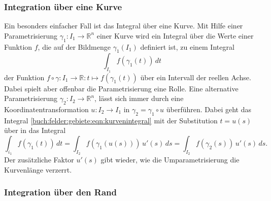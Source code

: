 \subsubsection{Integration über eine Kurve}
Ein besonders einfacher Fall ist das Integral über eine Kurve.
Mit Hilfe einer Parametrisierung $\gamma_1\colon I_1\to\mathbb{R}^n$
einer Kurve wird ein Integral über die Werte einer Funktion $f$, die auf
der Bildmenge $\gamma_1(I_1)$ definiert ist, zu einem Integral
\begin{equation}
\int_{I_1}
f(\gamma_1(t))
\,dt
\label{buch:felder:gebiete:eqn:kurvenintegral}
\end{equation}
der Funktion $f\circ\gamma\colon I_1\to\mathbb{R}:t\mapsto f(\gamma_1(t))$
über ein Intervall der reellen Achse.
Dabei spielt aber offenbar die Parametrisierung eine Rolle.
Eine alternative Parametrisierung $\gamma_2\colon I_2\to\mathbb{R}^n$,
lässt sich immer durch eine Koordinatentransformation $u\colon I_2\to I_1$
in $\gamma_2 = \gamma_1\circ u$ überführen.
Dabei geht das Integral
\eqref{buch:felder:gebiete:eqn:kurvenintegral}
mit der Substitution $t=u(s)$
über in das Integral
\[
\int_{i_1}
f(\gamma_1(t))
\,dt
=
\int_{I_2}
f(\gamma_1(u(s)))
\,
u'(s)
\,ds
=
\int_{I_2}
f(\gamma_2(s))
\,
u'(s)
\,ds.
\]
Der zusätzliche Faktor $u'(s)$ gibt wieder, wie die Umparametrisierung
die Kurvenlänge verzerrt.


%
%
\subsubsection{Integration über den Rand}


